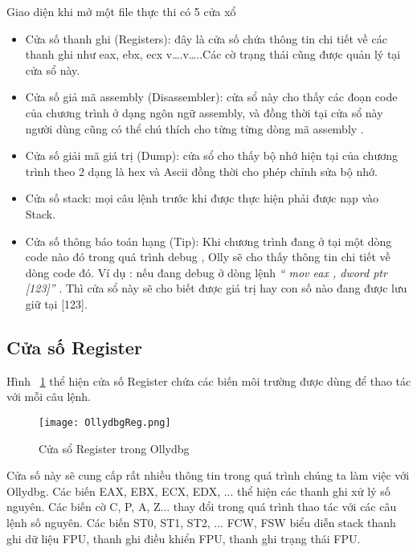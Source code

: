 Giao diện khi mở một file thực thi có 5 cửa xổ
	
	\begin{itemize}
		\item[1] Cửa số thanh ghi (Registers): đây là cửa số chứa thông tin chi tiết về các thanh ghi như eax, ebx, ecx v….v…..Các cờ trạng thái cũng được quản lý tại cửa sổ này.
		\item[2] Cửa số giả mã assembly (Disassembler): cửa sổ này cho thấy các đoạn code của chương trình ở dạng ngôn ngữ assembly, và đồng thời tại cửa sổ này người dùng cũng có thể chú thích cho từng từng dòng mã assembly .
		\item[3] Cửa số giải mã giá trị (Dump): cửa sổ cho thấy bộ nhớ hiện tại của chương trình theo 2 dạng là hex và Ascii đồng thời cho phép chỉnh sửa bộ nhớ.
		\item[4] Cửa số stack:  mọi câu lệnh trước khi được thực hiện phải được nạp vào Stack.
		\item[5] Cửa số thông báo toán hạng (Tip):  Khi chương trình đang ở tại một dòng code nào đó trong quá trình debug ,  Olly sẽ cho thấy thông tin chi tiết về dòng code đó. Ví dụ  : nếu đang debug ở dòng lệnh \textit{ “ mov eax , dword ptr [123]”} . Thì cửa sổ này sẽ cho biết được giá trị hay con số nào đang được lưu giữ tại [123].
		\end{itemize}
	
	\subsection*{Cửa số Register}	
	Hình ~\ref{fig:OllydbgReg} thể hiện cửa số Register chứa các biến môi trường được dùng để thao tác với  mỗi câu lệnh.
	\begin{center}
			\begin{figure}[htp]
				\begin{center}
					\texttt{[image: OllydbgReg.png]}
				\end{center}
				\caption{Cửa sổ Register trong Ollydbg}	
					\label{fig:OllydbgReg}		
			\end{figure}
		\end{center}		
		
		Cửa số này sẽ cung cấp rất nhiều thông tin trong quá trình chúng ta làm việc với Ollydbg. Các biến EAX, EBX, ECX, EDX, ... thể hiện các thanh ghi xử lý số nguyên. Các biến cờ C, P, A, Z... thay đổi trong quá trình thao tác với các câu lệnh số nguyên. Các biến ST0, ST1, ST2, ... FCW, FSW biểu diễn stack thanh ghi dữ liệu FPU, thanh ghi điều khiển FPU, thanh ghi trạng thái FPU.
		
